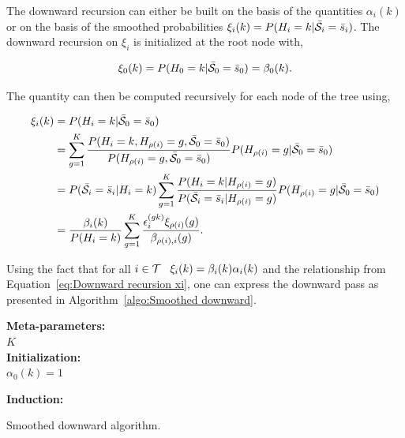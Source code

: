 \documentclass[a4paper,11pt]{report}
\begin{document}
				The downward recursion can either be built on the basis of the quantities $\alpha_{i}(k)$ or on the basis of the smoothed probabilities $\xi_{i}(k) = P(H_{i}=k | \bar{\mathcal{S}}_{i}= \bar{s}_{i})$. The downward recursion on $\xi_{i}$ is initialized at the root node with,
				
				\begin{equation}
				  \xi_{0}(k)= P(H_{0}=k | \bar{\mathcal{S}}_{0}=\bar{s}_{0}) = \beta_{0}(k).
				  \label{eq:Downward init}
				\end{equation}

				The quantity can then be computed recursively for each node of the tree using,
				
				\begin{equation}
					\begin{split}
						\xi_{i}(k)	&= P(H_{i}=k | \bar{\mathcal{S}}_{0}=\bar{s}_{0}) \\
												&= \sum_{g=1}^{K} \frac{P(H_{i}=k, H_{\rho(i)}=g, \bar{\mathcal{S}}_{0}= \bar{s}_{0})}{P(H_{\rho(i)}=g, \bar{\mathcal{S}}_{0}= \bar{s}_{0})} P(H_{\rho(i)}=g | \bar{\mathcal{S}}_{0}= \bar{s}_{0})\\
												&= P(\bar{\mathcal{S}}_{i}= \bar{s}_{i} | H_{i}=k)  
													 \sum_{g=1}^{K} \frac{P(H_{i}=k | H_{\rho(i)}=g)}{P(\bar{\mathcal{S}}_{i}= \bar{s}_{i} | H_{\rho(i)}=g)}
 													 P(H_{\rho(i)}=g | \bar{\mathcal{S}}_{0}= \bar{s}_{0})\\
 												&= \frac{\beta_{i}(k)}{P(H_{i}=k)} \sum_{g=1}^{K} \frac{ \epsilon_{i}^{(gk)} \xi_{\rho(i)}(g)}{\beta_{\rho(i),i}(g)}.
						\end{split}
						\label{eq:Downward recursion xi}
				\end{equation}
				
				Using the fact that for all $i \in \mathcal{T} \;\;\; \xi_{i}(k) = \beta_{i}(k)\alpha_{i}(k)$ and the relationship from Equation~\ref{eq:Downward recursion xi}, one can express the downward pass as presented in Algorithm~\ref{algo:Smoothed downward}.
    
				\begin{center}
					\begin{algorithm}
						\textbf{Meta-parameters:}\\
							$K$\\
								
						\textbf{Initialization:}\\
							$\alpha_{0}(k) = 1$
								
						\textbf{Induction:}\\
						\caption{Smoothed downward algorithm.}
						\label{algo:Smoothed downward}		
					\end{algorithm}        
				\end{center}
				
\end{document}
